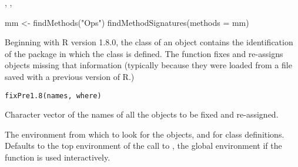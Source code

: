 %
\begin{SeeAlso}\relax
 , ,  
\end{SeeAlso}
%
\begin{Examples}
\begin{ExampleCode}
mm <-  findMethods("Ops")
findMethodSignatures(methods = mm)
\end{ExampleCode}
\end{Examples}
%
\begin{Description}\relax
Beginning with R version 1.8.0, the class of an object contains the
identification of the package in which the class is defined.  The
function  fixes and re-assigns objects missing that information
(typically because they were loaded from a file saved with a previous
version of R.)
\end{Description}
%
\begin{Usage}
\begin{verbatim}
fixPre1.8(names, where)
\end{verbatim}
\end{Usage}
%
\begin{Arguments}
\begin{ldescription}
\item[\code{names}]  Character vector of the names of all the objects to be
fixed and re-assigned.
\item[\code{where}] The environment from which to look for the objects, and
for class definitions.  Defaults to the top environment of the
call to , the global environment if the function
is used interactively.
\end{ldescription}
\end{Arguments}
%
